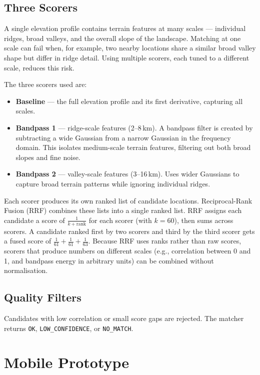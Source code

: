\subsection{Three Scorers}

A single elevation profile contains terrain features at many scales --- individual ridges, broad valleys, and the overall slope of the landscape. Matching at one scale can fail when, for example, two nearby locations share a similar broad valley shape but differ in ridge detail. Using multiple scorers, each tuned to a different scale, reduces this risk.

The three scorers used are:

\begin{itemize}
    \item \textbf{Baseline} --- the full elevation profile and its first derivative, capturing all scales.
    \item \textbf{Bandpass 1} --- ridge-scale features (2--8\,km). A bandpass filter is created by subtracting a wide Gaussian from a narrow Gaussian in the frequency domain. This isolates medium-scale terrain features, filtering out both broad slopes and fine noise.
    \item \textbf{Bandpass 2} --- valley-scale features (3--16\,km). Uses wider Gaussians to capture broad terrain patterns while ignoring individual ridges.
\end{itemize}

Each scorer produces its own ranked list of candidate locations. Reciprocal-Rank Fusion (RRF) combines these lists into a single ranked list. RRF assigns each candidate a score of $\frac{1}{k + \text{rank}}$ for each scorer (with $k = 60$), then sums across scorers. A candidate ranked first by two scorers and third by the third scorer gets a fused score of $\frac{1}{61} + \frac{1}{61} + \frac{1}{63}$. Because RRF uses ranks rather than raw scores, scorers that produce numbers on different scales (e.g., correlation between 0 and 1, and bandpass energy in arbitrary units) can be combined without normalisation.

\subsection{Quality Filters}

Candidates with low correlation or small score gaps are rejected. The matcher returns \texttt{OK}, \texttt{LOW\_CONFIDENCE}, or \texttt{NO\_MATCH}.

\section{Mobile Prototype}
\label{sec:mobile}

